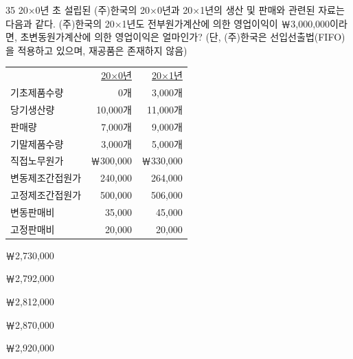 \begin{question}{35}
20×0년 초 설립된 (주)한국의 20×0년과 20×1년의 생산 및 판매와 관련된 자료는 다음과 같다. (주)한국의 20×1년도 전부원가계산에 의한 영업이익이 ￦3,000,000이라면, 초변동원가계산에 의한 영업이익은 얼마인가? (단, (주)한국은 선입선출법(FIFO)을 적용하고 있으며, 재공품은 존재하지 않음)
\par
{\small\centering
\begin{tabular}{lrr}
\hline
 & \uline{20×0년} & \uline{20×1년} \\
기초제품수량 & 0개 & 3,000개 \\
당기생산량 & 10,000개 & 11,000개 \\
판매량 & 7,000개 & 9,000개 \\
기말제품수량 & 3,000개 & 5,000개 \\
직접노무원가 & ￦300,000 & ￦330,000 \\
변동제조간접원가 & 240,000 & 264,000 \\
고정제조간접원가 & 500,000 & 506,000 \\
변동판매비 & 35,000 & 45,000 \\
고정판매비 & 20,000 & 20,000 \\
\hline
\end{tabular}\par}
\begin{choices}
  \item ￦2,730,000
  \item ￦2,792,000
  \item ￦2,812,000
  \item ￦2,870,000
  \item ￦2,920,000
\end{choices}
\end{question}

